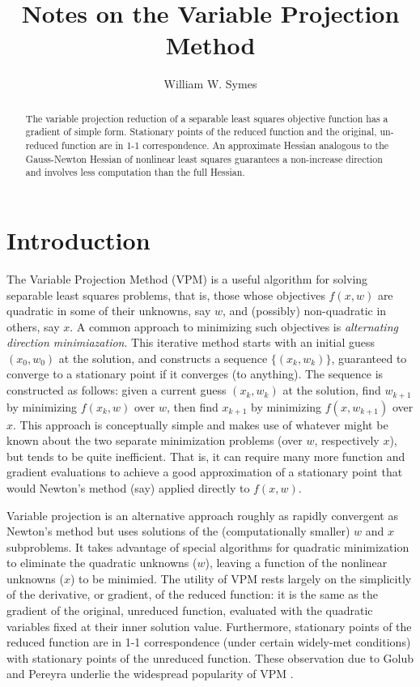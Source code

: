 \title{Notes on the Variable Projection Method}
\author{William W. Symes}

\begin{abstract}
The variable projection reduction of a separable least squares objective function has a gradient of simple form. Stationary points of the reduced function and the original, un-reduced function are in 1-1 correspondence. An approximate Hessian analogous to the Gauss-Newton Hessian of nonlinear least squares guarantees a non-increase direction and involves less computation than the full Hessian.
\end{abstract}

\section{Introduction}
The Variable Projection Method (VPM) is a useful algorithm for solving separable least squares problems, that is, those whose objectives $f(x,w)$ are quadratic in some of their unknowns, say $w$, and (possibly) non-quadratic in others, say $x$. A common approach to minimizing such objectives is {\em alternating direction minimiazation}. This iterative method starts with an initial guess $(x_0,w_0)$ at the solution, and constructs a sequence $\{(x_k,w_k)\}$, guaranteed to converge to a stationary point if it converges (to anything). The sequence is constructed as follows: given a current guess $(x_k,w_k)$ at the solution, find $w_{k+1}$ by minimizing $f(x_k,w)$ over $w$, then find $x_{k+1}$ by minimizing $f(x,w_{k+1})$ over $x$. This approach is conceptually simple and makes use of whatever might be known about the two separate minimization problems (over $w$, respectively $x$), but tends to be quite inefficient. That is, it can require many more function and gradient evaluations to achieve a good approximation of a stationary point that would Newton's method (say) applied directly to $f(x,w)$.

Variable projection is an alternative approach roughly as rapidly convergent as Newton's method but uses solutions of the (computationally smaller) $w$ and $x$ subproblems.
It takes advantage of special algorithms for quadratic minimization to eliminate the quadratic unknowns ($w$), leaving a function of the nonlinear unknowns ($x$) to be minimied. The utility of VPM rests largely on the simplicitly of the derivative, or gradient, of the reduced function: it is the same as the gradient of the original, unreduced function, evaluated with the quadratic variables fixed at their inner solution value. Furthermore, stationary points of the reduced function are in 1-1 correspondence (under certain widely-met conditions) with stationary points of the unreduced function. These observation due to Golub and Pereyra underlie the widespread popularity of VPM  \cite[]{GolubPereyra:73,GolubPereyra:03}.

